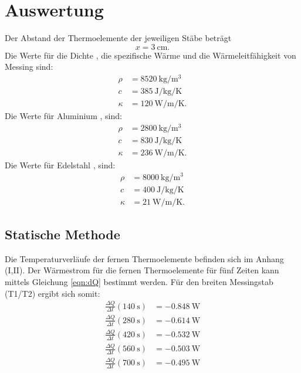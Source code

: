 \section{Auswertung}
\label{sec:Auswertung}
Der Abstand der Thermoelemente der jeweiligen Stäbe beträgt
\begin{equation*}
    x = \SI{3}{\centi\meter}.
\end{equation*}
Die Werte für die Dichte \cite{V204}, die spezifische Wärme \cite{V204} und 
die Wärmeleitfähigkeit \cite{wiki} von Messing sind: 
\begin{align*}
    \rho &= \SI{8520}{\kilo\gram\per\cubic\meter} \\
    c &= \SI{385}{\joule\per\kilo\gram\per\kelvin} \\
    \kappa &= \SI{120}{\watt\per\meter\per\kelvin}.
\end{align*}
Die Werte für Aluminium \cite{V204}, \cite{wiki} sind:
\begin{align*}
    \rho &= \SI{2800}{\kilo\gram\per\cubic\meter} \\
    c &= \SI{830}{\joule\per\kilo\gram\per\kelvin} \\
    \kappa &= \SI{236}{\watt\per\meter\per\kelvin}.
\end{align*}
Die Werte für Edelstahl \cite{V204}, \cite{edelstahl} sind:
\begin{align*}
    \rho &= \SI{8000}{\kilo\gram\per\cubic\meter} \\
    c &= \SI{400}{\joule\per\kilo\gram\per\kelvin} \\
    \kappa &= \SI{21}{\watt\per\meter\per\kelvin}.
\end{align*}

\subsection{Statische Methode}



Die Temperaturverläufe der fernen Thermoelemente
befinden sich im Anhang (I,II).
\newline
Der Wärmestrom für die fernen Thermoelemente für fünf Zeiten kann mittels
Gleichung \ref{eqn:dQ} bestimmt werden.
Für den breiten Messingstab (T1/T2) ergibt sich somit:
\begin{align*} %
   \frac{\Delta Q}{\Delta t}(\SI{140}{\second}) &= \SI{-0.848}{\watt} \\ 
   \frac{\Delta Q}{\Delta t}(\SI{280}{\second}) &= \SI{-0.614}{\watt} \\ 
   \frac{\Delta Q}{\Delta t}(\SI{420}{\second}) &= \SI{-0.532}{\watt} \\ 
   \frac{\Delta Q}{\Delta t}(\SI{560}{\second}) &= \SI{-0.503}{\watt} \\ 
   \frac{\Delta Q}{\Delta t}(\SI{700}{\second}) &= \SI{-0.495}{\watt} \\ 
\end{align*}

